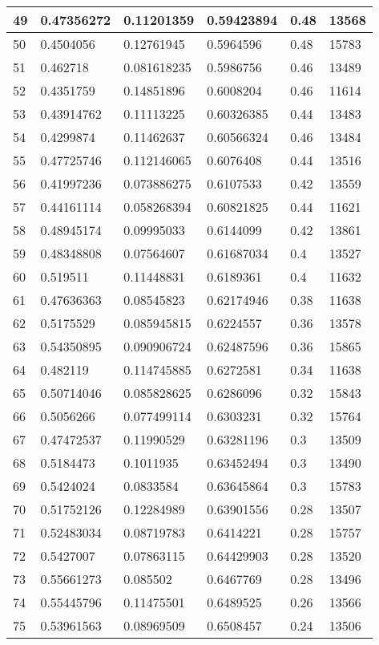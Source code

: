 \begin{longtable}{|l|l|l|l|l|l|}
49 & 0.47356272 & 0.11201359 & 0.59423894 & 0.48 & 13568 \\ \hline 
50 & 0.4504056 & 0.12761945 & 0.5964596 & 0.48 & 15783 \\ \hline 
51 & 0.462718 & 0.081618235 & 0.5986756 & 0.46 & 13489 \\ \hline 
52 & 0.4351759 & 0.14851896 & 0.6008204 & 0.46 & 11614 \\ \hline 
53 & 0.43914762 & 0.11113225 & 0.60326385 & 0.44 & 13483 \\ \hline 
54 & 0.4299874 & 0.11462637 & 0.60566324 & 0.46 & 13484 \\ \hline 
55 & 0.47725746 & 0.112146065 & 0.6076408 & 0.44 & 13516 \\ \hline 
56 & 0.41997236 & 0.073886275 & 0.6107533 & 0.42 & 13559 \\ \hline 
57 & 0.44161114 & 0.058268394 & 0.60821825 & 0.44 & 11621 \\ \hline 
58 & 0.48945174 & 0.09995033 & 0.6144099 & 0.42 & 13861 \\ \hline 
59 & 0.48348808 & 0.07564607 & 0.61687034 & 0.4 & 13527 \\ \hline 
60 & 0.519511 & 0.11448831 & 0.6189361 & 0.4 & 11632 \\ \hline 
61 & 0.47636363 & 0.08545823 & 0.62174946 & 0.38 & 11638 \\ \hline 
62 & 0.5175529 & 0.085945815 & 0.6224557 & 0.36 & 13578 \\ \hline 
63 & 0.54350895 & 0.090906724 & 0.62487596 & 0.36 & 15865 \\ \hline 
64 & 0.482119 & 0.114745885 & 0.6272581 & 0.34 & 11638 \\ \hline 
65 & 0.50714046 & 0.085828625 & 0.6286096 & 0.32 & 15843 \\ \hline 
66 & 0.5056266 & 0.077499114 & 0.6303231 & 0.32 & 15764 \\ \hline 
67 & 0.47472537 & 0.11990529 & 0.63281196 & 0.3 & 13509 \\ \hline 
68 & 0.5184473 & 0.1011935 & 0.63452494 & 0.3 & 13490 \\ \hline 
69 & 0.5424024 & 0.0833584 & 0.63645864 & 0.3 & 15783 \\ \hline 
70 & 0.51752126 & 0.12284989 & 0.63901556 & 0.28 & 13507 \\ \hline 
71 & 0.52483034 & 0.08719783 & 0.6414221 & 0.28 & 15757 \\ \hline 
72 & 0.5427007 & 0.07863115 & 0.64429903 & 0.28 & 13520 \\ \hline 
73 & 0.55661273 & 0.085502 & 0.6467769 & 0.28 & 13496 \\ \hline 
74 & 0.55445796 & 0.11475501 & 0.6489525 & 0.26 & 13566 \\ \hline 
75 & 0.53961563 & 0.08969509 & 0.6508457 & 0.24 & 13506 \\ \hline 
\end{longtable}